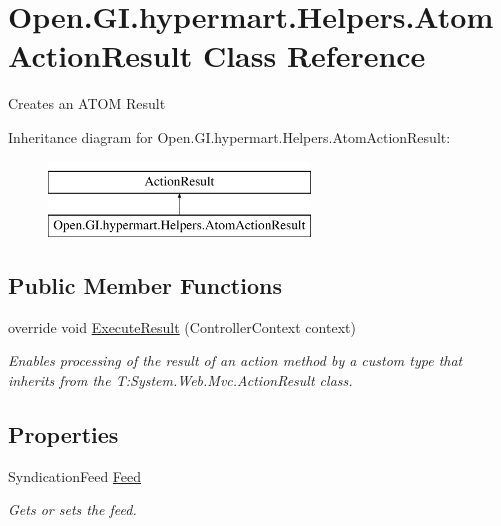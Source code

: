 \hypertarget{class_open_1_1_g_i_1_1hypermart_1_1_helpers_1_1_atom_action_result}{}\section{Open.\+G\+I.\+hypermart.\+Helpers.\+Atom\+Action\+Result Class Reference}
\label{class_open_1_1_g_i_1_1hypermart_1_1_helpers_1_1_atom_action_result}


Creates an A\+T\+OM Result  


Inheritance diagram for Open.\+G\+I.\+hypermart.\+Helpers.\+Atom\+Action\+Result\+:\begin{figure}[H]
\begin{center}
\leavevmode
\includegraphics[height=2.000000cm]{class_open_1_1_g_i_1_1hypermart_1_1_helpers_1_1_atom_action_result}
\end{center}
\end{figure}
\subsection*{Public Member Functions}
\begin{DoxyCompactItemize}
\item 
override void \hyperlink{class_open_1_1_g_i_1_1hypermart_1_1_helpers_1_1_atom_action_result_a525b622f00e4c2294a4fedb438273981}{Execute\+Result} (Controller\+Context context)
\begin{DoxyCompactList}\small\item\em Enables processing of the result of an action method by a custom type that inherits from the T\+:\+System.\+Web.\+Mvc.\+Action\+Result class. \end{DoxyCompactList}\end{DoxyCompactItemize}
\subsection*{Properties}
\begin{DoxyCompactItemize}
\item 
Syndication\+Feed \hyperlink{class_open_1_1_g_i_1_1hypermart_1_1_helpers_1_1_atom_action_result_a17a5a951bdf5ed9f8a93f24843e124ca}{Feed}
\begin{DoxyCompactList}\small\item\em Gets or sets the feed. \end{DoxyCompactList}\end{DoxyCompactItemize}


